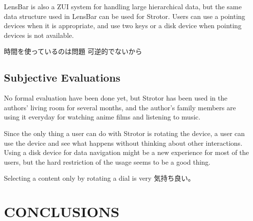 \documentclass{article}
\begin{document}
LensBar\cite{Masui:1998:LVB:647341.721215}
is also a ZUI system for handling large hierarchical data,
but the same data structure used in LensBar can be used for Strotor.
Users can use a pointing devices when it is appropriate,
and use two keys or a disk device when pointing devices is not available.

時間を使っているのは問題
可逆的でないから

\subsection{Subjective Evaluations}

No formal evaluation have been done yet, but Strotor has been used in the authors'
living room for several months, and the author's family members are using it
everyday for watching anime films and listening to music.

Since the only thing a user can do with Strotor is rotating the device,
a user can use the device and see what happens without thinking about
other interactions.
Using a disk device for data navigation might be a new experience for
most of the users, but the hard restriction of the usage seems to be a
good thing.

Selecting a content only by rotating a dial is very 気持ち良い。


\section*{CONCLUSIONS}

\small{


}
\end{document}
